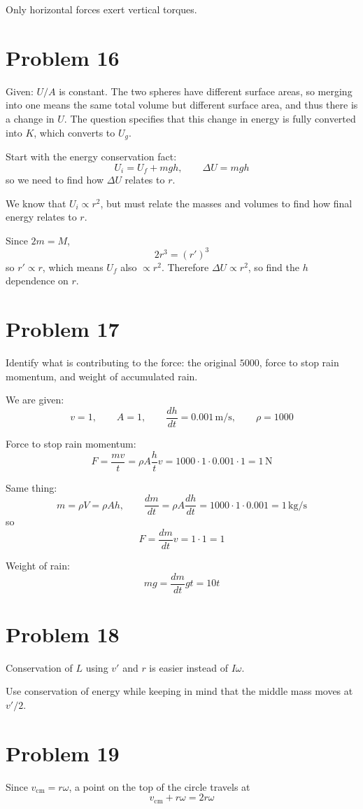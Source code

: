 \documentclass[11pt]{article}
\begin{document}
Only horizontal forces exert vertical torques.

\section*{Problem 16}
Given: $U/A$ is constant. The two spheres have different surface areas, so merging into one means the same total volume but different surface area, and thus there is a change in $U$. The question specifies that this change in energy is fully converted into $K$, which converts to $U_g$.

Start with the energy conservation fact:
\[
U_i=U_f+mgh, \qquad \Delta U=mgh
\]
so we need to find how $\Delta U$ relates to $r$.

We know that $U_i\propto r^2$, but must relate the masses and volumes to find how final energy relates to $r$.

Since $2m=M$,
\[
2r^3=(r')^3
\]
so $r'\propto r$, which means $U_f$ also $\propto r^2$. Therefore $\Delta U\propto r^2$, so find the $h$ dependence on $r$.

\section*{Problem 17}
Identify what is contributing to the force: the original $5000$, force to stop rain momentum, and weight of accumulated rain.

We are given:
\[
v=1, \qquad A=1, \qquad \frac{dh}{dt}=0.001\,\text{m/s}, \qquad \rho=1000
\]

Force to stop rain momentum:
\[
F=\frac{mv}{t}=\rho A\frac{h}{t}v=1000\cdot 1\cdot 0.001\cdot 1=1\,\text{N}
\]

Same thing:
\[
m=\rho V=\rho Ah, \qquad \frac{dm}{dt}=\rho A\frac{dh}{dt}=1000\cdot 1\cdot 0.001=1\,\text{kg/s}
\]
so
\[
F=\frac{dm}{dt}v=1\cdot 1=1
\]

Weight of rain:
\[
mg=\frac{dm}{dt}gt=10t
\]

\section*{Problem 18}
Conservation of $L$ using $v'$ and $r$ is easier instead of $I\omega$.

Use conservation of energy while keeping in mind that the middle mass moves at $v'/2$.

\section*{Problem 19}
Since $v_{\mathrm{cm}}=r\omega$, a point on the top of the circle travels at
\[
v_{\mathrm{cm}}+r\omega=2r\omega
\]
\end{document}
